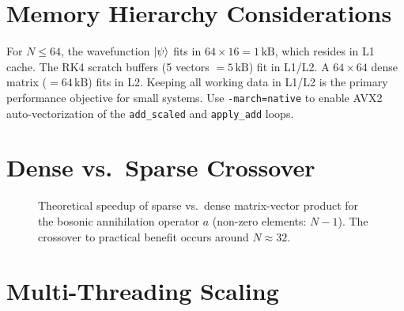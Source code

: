 \documentclass[11pt,a4paper,twoside]{book}
\newcommand{\code}[1]{\texttt{\small#1}}
\theoremstyle{definition}
\theoremstyle{remark}
\begin{document}
\section{Memory Hierarchy Considerations}
\label{sec:memory-hierarchy}

\begin{perfbox}
  For $N \leq 64$, the wavefunction $\ket{\psi}$ fits in
  $64 \times 16 = 1\,\mathrm{kB}$, which resides in L1 cache.
  The RK4 scratch buffers (5 vectors $= 5\,\mathrm{kB}$) fit in L1/L2.
  A $64 \times 64$ dense matrix ($= 64\,\mathrm{kB}$) fits in L2.
  Keeping all working data in L1/L2 is the primary performance objective
  for small systems. Use \code{-march=native} to enable AVX2
  auto-vectorization of the \code{add\_scaled} and \code{apply\_add} loops.
\end{perfbox}

\section{Dense vs.\ Sparse Crossover}
\label{sec:dense-sparse-crossover}

\begin{figure}[H]
\centering
{}
\caption{Theoretical speedup of sparse vs.\ dense matrix-vector product
         for the bosonic annihilation operator $a$ (non-zero elements: $N-1$).
         The crossover to practical benefit occurs around $N \approx 32$.}
\label{fig:sparse-speedup}
\end{figure}

\section{Multi-Threading Scaling}
\label{sec:threading}
\end{document}
